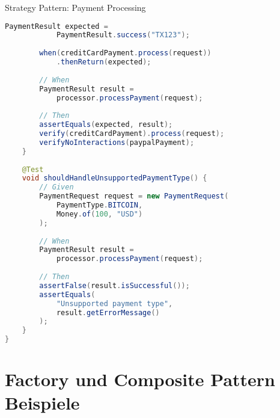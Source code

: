 \begin{example2}[breakable]{Strategy Pattern: Payment Processing}
\begin{lstlisting}[language=Java, style=basesmol]
        PaymentResult expected = 
            PaymentResult.success("TX123");
            
        when(creditCardPayment.process(request))
            .thenReturn(expected);
        
        // When
        PaymentResult result = 
            processor.processPayment(request);
        
        // Then
        assertEquals(expected, result);
        verify(creditCardPayment).process(request);
        verifyNoInteractions(paypalPayment);
    }
    
    @Test
    void shouldHandleUnsupportedPaymentType() {
        // Given
        PaymentRequest request = new PaymentRequest(
            PaymentType.BITCOIN,
            Money.of(100, "USD")
        );
        
        // When
        PaymentResult result = 
            processor.processPayment(request);
        
        // Then
        assertFalse(result.isSuccessful());
        assertEquals(
            "Unsupported payment type",
            result.getErrorMessage()
        );
    }
}
\end{lstlisting}
\end{example2}

\section{Factory und Composite Pattern Beispiele}

